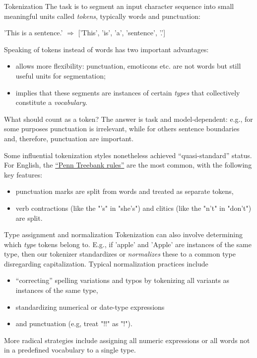 \documentclass[style=upen, size=14pt]{powerdot}
\newcommand{\gold}{\color{arany}}
\begin{document}
\begin{slide}{Tokenization}
  The task is to segment an input character sequence into small meaningful units
  called \emph{{\gold tokens}}, typically words and punctuation:\bigskip

  'This is a sentence.' $\Rightarrow$ ['This', 'is', 'a', 'sentence', '.']\bigskip

  Speaking of tokens instead of words has two important advantages:
  \begin{itemize}
  \item allows more flexibility: punctuation, emoticons etc. are not words but
    still useful units for segmentation;
  \item implies that these segments are instances of certain \emph{{\gold
        types}} that collectively constitute a \emph{{\gold vocabulary}}.
  \end{itemize}
\end{slide}

\begin{slide}[toc=]{What should count as a token?}
  The answer is task and model-dependent: e.g., for some purposes punctuation is
  irrelevant, while for others sentence boundaries and, therefore, punctuation
  are important.\bigskip

  Some influential tokenization styles nonetheless achieved ``quasi-standard''
  status. For English, the
  \href{ftp://ftp.cis.upenn.edu/pub/treebank/public_html/tokenization.html}{``Penn
    Treebank rules''} are the most common, with the following key features:
  \begin{itemize}
  \item punctuation marks are split from words and treated as separate tokens,
  \item verb contractions (like the "'s" in "she's") and clitics (like the "n't"
    in "don't") are split. 
  \end{itemize}
\end{slide}

\begin{slide}[toc=]{Type assignment and normalization}
  Tokenization can also involve determining which \emph{type} tokens belong to.
  E.g., if 'apple' and 'Apple' are instances of the same type, then our
  tokenizer standardizes or \emph{{\gold normalizes}} these to a common type
  disregarding capitalization. Typical normalization practices include
  
  \begin{itemize}
  \item ``correcting'' spelling variations and typos by tokenizing all variants
    as instances of the same type,
  \item standardizing numerical or date-type expressions
  \item and punctuation (e.g, treat "!!" as "!").
  \end{itemize}

  More radical strategies include assigning all numeric expressions or all
  words not in a predefined vocabulary to a single type.
\end{slide}
\end{document}
